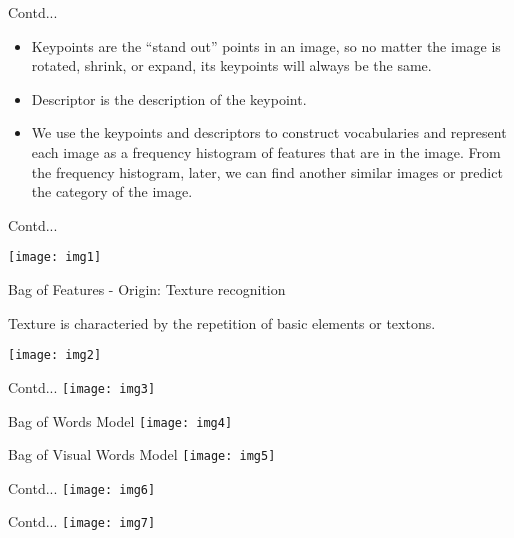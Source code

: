 \documentclass{beamer}
\begin{document}
\begin{frame}{Contd...}
	\begin{flushleft}
		\begin{itemize}
			\item Keypoints are the “stand out” points in an image, so no matter the image is rotated, shrink, or expand, its keypoints will always be the same.
			\item Descriptor is the description of the keypoint. 
			\item  We use the keypoints and descriptors to construct vocabularies and represent each image as a frequency histogram of features that are in the image. From the frequency histogram, later, we can find another similar images or predict the category of the image.
		\end{itemize}
	\end{flushleft}
\end{frame}

\begin{frame}{Contd...}
\begin{flushleft}
	\texttt{[image: img1]}
\end{flushleft}
\end{frame}

\begin{frame}{Bag of Features - Origin: Texture recognition}
\begin{flushleft}
Texture is characteried by the repetition of basic elements or textons.
\end{flushleft}
\texttt{[image: img2]}
\end{frame}

\begin{frame}{Contd...}
	\texttt{[image: img3]}
\end{frame}

\begin{frame}{Bag of Words Model}
	\texttt{[image: img4]}
\end{frame}

\begin{frame}{Bag of Visual Words Model}
	\texttt{[image: img5]}
\end{frame}

\begin{frame}{Contd...}
	\texttt{[image: img6]}
\end{frame}

\begin{frame}{Contd...}
	\texttt{[image: img7]}
\end{frame}
\end{document}
